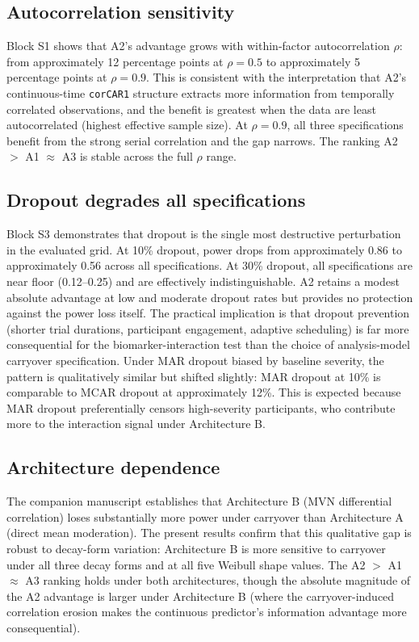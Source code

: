 \documentclass[
]{article}
\begin{document}
\subsection{Autocorrelation sensitivity}\label{autocorrelation-sensitivity}

Block S1 shows that A2's advantage grows with within-factor
autocorrelation \(\rho\): from approximately 12 percentage points
at \(\rho = 0.5\) to approximately 5 percentage points at
\(\rho = 0.9\). This is consistent with the interpretation that
A2's continuous-time \texttt{corCAR1} structure extracts more
information from temporally correlated observations, and the
benefit is greatest when the data are least autocorrelated
(highest effective sample size). At \(\rho = 0.9\), all three
specifications benefit from the strong serial correlation and
the gap narrows. The ranking A2 \(>\) A1 \(\approx\) A3 is stable
across the full \(\rho\) range.

\subsection{Dropout degrades all specifications}\label{dropout-degrades-all-specifications}

Block S3 demonstrates that dropout is the single most
destructive perturbation in the evaluated grid. At 10\% dropout,
power drops from approximately 0.86 to approximately 0.56
across all specifications. At 30\% dropout, all specifications
are near floor (0.12--0.25) and are effectively
indistinguishable. A2 retains a modest absolute advantage at low
and moderate dropout rates but provides no protection against
the power loss itself. The practical implication is that dropout
prevention (shorter trial durations, participant engagement,
adaptive scheduling) is far more consequential for the
biomarker-interaction test than the choice of analysis-model
carryover specification. Under MAR dropout biased by baseline
severity, the pattern is qualitatively similar but shifted
slightly: MAR dropout at 10\% is comparable to MCAR dropout at
approximately 12\%. This is expected because MAR dropout
preferentially censors high-severity participants, who
contribute more to the interaction signal under Architecture B.

\subsection{Architecture dependence}\label{architecture-dependence}

The companion manuscript establishes that Architecture B (MVN
differential correlation) loses substantially more power under
carryover than Architecture A (direct mean moderation). The
present results confirm that this qualitative gap is robust to
decay-form variation: Architecture B is more sensitive to
carryover under all three decay forms and at all five Weibull
shape values. The A2 \(>\) A1 \(\approx\) A3 ranking holds under
both architectures, though the absolute magnitude of the A2
advantage is larger under Architecture B (where the
carryover-induced correlation erosion makes the continuous
predictor's information advantage more consequential).
\end{document}
